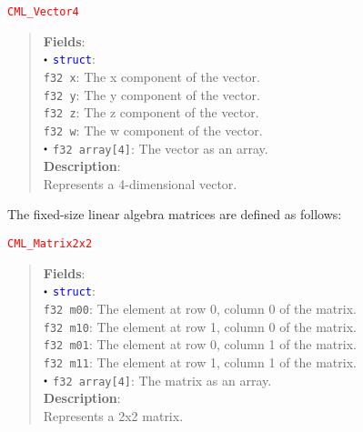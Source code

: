 \documentclass[a4paper,oneside,8pt]{extarticle}
\newcommand{\union}[1]{
  \noindent\textcolor{red}{\texttt{#1}}
  \vspace{-0.3em}
}
\renewcommand{\dot}{\raisebox{0.3ex}{\scalebox{0.6}{$\bullet$}}}
\theoremstyle{definition}
\begin{document}
\union{CML\_Vector4}
\begin{quote}
  \textbf{Fields}: \\
  $\dot$ \textcolor{blue}{\texttt{struct}}: \\
  \indent\hspace{1em} \texttt{f32 x}: The x component of the vector. \\
  \indent\hspace{1em} \texttt{f32 y}: The y component of the vector. \\
  \indent\hspace{1em} \texttt{f32 z}: The z component of the vector. \\
  \indent\hspace{1em} \texttt{f32 w}: The w component of the vector. \\
  $\dot$ \texttt{f32 array[4]}: The vector as an array. \\

  \vspace{-0.75em}
  \textbf{Description}: \\
  Represents a 4-dimensional vector. \\
\end{quote}

The fixed-size linear algebra matrices are defined as follows: \newline

\union{CML\_Matrix2x2}
\begin{quote}
  \textbf{Fields}: \\
  $\dot$ \textcolor{blue}{\texttt{struct}}: \\
  \indent\hspace{1em} \texttt{f32 m00}: The element at row 0, column 0 of the matrix. \\
  \indent\hspace{1em} \texttt{f32 m10}: The element at row 1, column 0 of the matrix. \\
  \indent\hspace{1em} \texttt{f32 m01}: The element at row 0, column 1 of the matrix. \\
  \indent\hspace{1em} \texttt{f32 m11}: The element at row 1, column 1 of the matrix. \\
  $\dot$ \texttt{f32 array[4]}: The matrix as an array. \\

  \vspace{-0.75em}
  \textbf{Description}: \\
  Represents a 2x2 matrix. \\
\end{quote}
\end{document}
